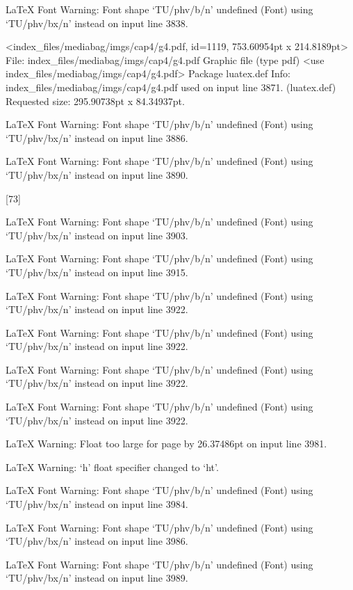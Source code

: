 LaTeX Font Warning: Font shape `TU/phv/b/n' undefined
(Font)              using `TU/phv/bx/n' instead on input line 3838.

<index_files/mediabag/imgs/cap4/g4.pdf, id=1119, 753.60954pt x 214.8189pt>
File: index_files/mediabag/imgs/cap4/g4.pdf Graphic file (type pdf)
<use index_files/mediabag/imgs/cap4/g4.pdf>
Package luatex.def Info: index_files/mediabag/imgs/cap4/g4.pdf  used on input line 3871.
(luatex.def)             Requested size: 295.90738pt x 84.34937pt.

LaTeX Font Warning: Font shape `TU/phv/b/n' undefined
(Font)              using `TU/phv/bx/n' instead on input line 3886.


LaTeX Font Warning: Font shape `TU/phv/b/n' undefined
(Font)              using `TU/phv/bx/n' instead on input line 3890.

[73]

LaTeX Font Warning: Font shape `TU/phv/b/n' undefined
(Font)              using `TU/phv/bx/n' instead on input line 3903.


LaTeX Font Warning: Font shape `TU/phv/b/n' undefined
(Font)              using `TU/phv/bx/n' instead on input line 3915.


LaTeX Font Warning: Font shape `TU/phv/b/n' undefined
(Font)              using `TU/phv/bx/n' instead on input line 3922.


LaTeX Font Warning: Font shape `TU/phv/b/n' undefined
(Font)              using `TU/phv/bx/n' instead on input line 3922.


LaTeX Font Warning: Font shape `TU/phv/b/n' undefined
(Font)              using `TU/phv/bx/n' instead on input line 3922.


LaTeX Font Warning: Font shape `TU/phv/b/n' undefined
(Font)              using `TU/phv/bx/n' instead on input line 3922.


LaTeX Warning: Float too large for page by 26.37486pt on input line 3981.


LaTeX Warning: `h' float specifier changed to `ht'.


LaTeX Font Warning: Font shape `TU/phv/b/n' undefined
(Font)              using `TU/phv/bx/n' instead on input line 3984.


LaTeX Font Warning: Font shape `TU/phv/b/n' undefined
(Font)              using `TU/phv/bx/n' instead on input line 3986.


LaTeX Font Warning: Font shape `TU/phv/b/n' undefined
(Font)              using `TU/phv/bx/n' instead on input line 3989.


